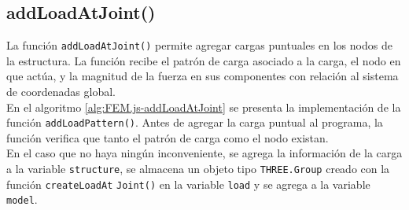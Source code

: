 \subsection{addLoadAtJoint()}

La función \verb|addLoadAtJoint()| permite agregar cargas puntuales en los nodos de la estructura. La función recibe el patrón de carga asociado a la carga, el nodo en que actúa, y la magnitud de la fuerza en sus componentes con relación al sistema de coordenadas global.\\

En el algoritmo \ref{alg:FEM.js-addLoadAtJoint} se presenta la implementación de la función \verb|addLoadPattern()|. Antes de agregar la carga puntual al programa, la función verifica que tanto el patrón de carga como el nodo existan.\\

En el caso que no haya ningún inconveniente, se agrega la información de la carga a la variable \verb|structure|, se almacena un objeto tipo \verb|THREE.Group| creado con la función \verb|createLoadAt| \verb|Joint()| en la variable \verb|load| y se agrega a la variable \verb|model|.\\

